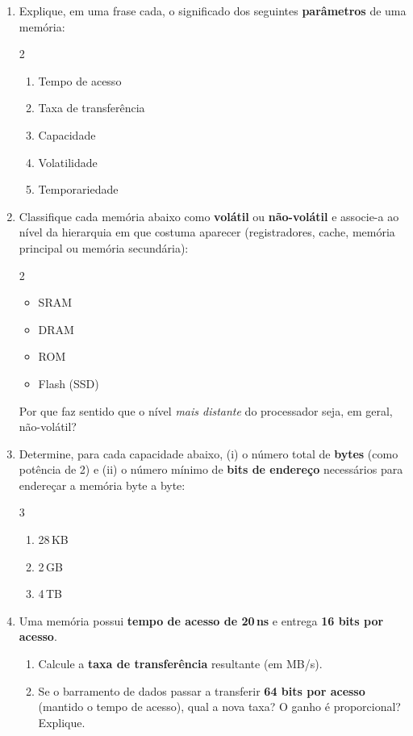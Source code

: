 \documentclass[10pt, a4paper]{article}
\begin{document}
\begin{enumerate}

\item Explique, em uma frase cada, o significado dos seguintes \textbf{par\^{a}metros} de uma mem\'{o}ria:
\begin{multicols}{2}
\begin{enumerate}
  \item Tempo de acesso
  \item Taxa de transfer\^{e}ncia
  \item Capacidade
  \item Volatilidade
  \item Temporariedade
\end{enumerate}
\end{multicols}

\item Classifique cada mem\'{o}ria abaixo como \textbf{vol\'{a}til} ou \textbf{n\~{a}o-vol\'{a}til} e associe-a ao n\'{i}vel da hierarquia em que costuma aparecer (registradores, cache, mem\'{o}ria principal ou mem\'{o}ria secund\'{a}ria):
\begin{multicols}{2}
\begin{itemize}
  \item[] SRAM
  \item[] DRAM
  \item[] ROM
  \item[] Flash (SSD)
\end{itemize}
\end{multicols}
Por que faz sentido que o n\'{i}vel \emph{mais distante} do processador seja, em geral, n\~{a}o-vol\'{a}til?

\item Determine, para cada capacidade abaixo, (i) o n\'{u}mero total de \textbf{bytes} (como pot\^{e}ncia de 2) e (ii) o n\'{u}mero m\'{i}nimo de \textbf{bits de endere\c{c}o} necess\'{a}rios para endere\c{c}ar a mem\'{o}ria byte a byte:
\begin{multicols}{3}
\begin{enumerate}
  \item 28\,KB
  \item 2\,GB
  \item 4\,TB
\end{enumerate}
\end{multicols}

\item Uma mem\'{o}ria possui \textbf{tempo de acesso de 20\,ns} e entrega \textbf{16 bits por acesso}.
\begin{enumerate}
  \item Calcule a \textbf{taxa de transfer\^{e}ncia} resultante (em MB/s).
  \item Se o barramento de dados passar a transferir \textbf{64 bits por acesso} (mantido o tempo de acesso), qual a nova taxa? O ganho \'{e} proporcional? Explique.
\end{enumerate}


\end{enumerate}
\end{document}
